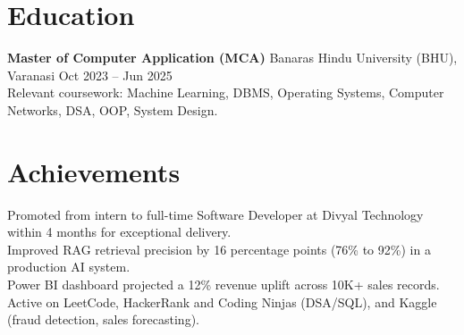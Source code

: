 \documentclass[10pt,a4paper]{article}
\begin{document}
\section{Education}
{\small
\textbf{Master of Computer Application (MCA)} \textbar{} Banaras Hindu University (BHU), Varanasi \hfill Oct 2023 -- Jun 2025\\
Relevant coursework: Machine Learning, DBMS, Operating Systems, Computer Networks, DSA, OOP, System Design.
}

\section{Achievements}
{\small
Promoted from intern to full-time Software Developer at Divyal Technology within 4 months for exceptional delivery.\\
Improved RAG retrieval precision by 16 percentage points (76\% to 92\%) in a production AI system.\\
Power BI dashboard projected a 12\% revenue uplift across 10K+ sales records.\\
Active on LeetCode, HackerRank and Coding Ninjas (DSA/SQL), and Kaggle (fraud detection, sales forecasting).
}
\end{document}
